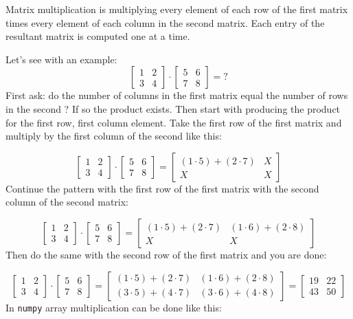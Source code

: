 Matrix multiplication is multiplying every element of each row of the first matrix times every element of each column in the second matrix. Each entry of the resultant matrix is computed one at a time.

Let's see with an example: \[ 
\begin{bmatrix}
1 & 2 \\
3 & 4
\end{bmatrix}
\cdot
\begin{bmatrix}
5 & 6 \\
7 & 8
\end{bmatrix}
= ?
\]
First ask: do the number of columns in the first matrix equal the number of rows in the second ? If so the product exists. Then start with producing the product for the first row, first column element. Take the first row of the first matrix and multiply by the first column of the second like this:

\[ 
\begin{bmatrix}
1 & 2 \\
3 & 4
\end{bmatrix}
\cdot
\begin{bmatrix}
5 & 6 \\
7 & 8
\end{bmatrix}
=
\begin{bmatrix}
(1\cdot 5) + (2\cdot 7) & X \\
X & X
\end{bmatrix}
\]
Continue the pattern with the first row of the first matrix with the second column of the second matrix:

\[ 
\begin{bmatrix}
1 & 2 \\
3 & 4
\end{bmatrix}
\cdot
\begin{bmatrix}
5 & 6 \\
7 & 8
\end{bmatrix}
=
\begin{bmatrix}
(1\cdot 5) + (2\cdot 7) & (1\cdot 6) + (2\cdot 8)  \\
X & X
\end{bmatrix}
\]
Then do the same with the second row of the first matrix and you are done:

\[ 
\begin{bmatrix}
1 & 2 \\
3 & 4
\end{bmatrix}
\cdot
\begin{bmatrix}
5 & 6 \\
7 & 8
\end{bmatrix}
=
\begin{bmatrix}
(1\cdot 5) + (2\cdot 7) & (1\cdot 6) + (2\cdot 8)  \\
(3\cdot 5) + (4\cdot 7) & (3\cdot 6) + (4\cdot 8) 
\end{bmatrix}
=
\begin{bmatrix}
19 & 22 \\
43 & 50 
\end{bmatrix}
\]
In \texttt{numpy} array multiplication can be done like this:

